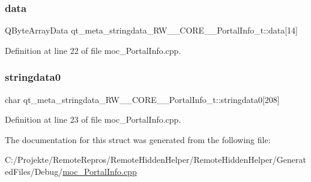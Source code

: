 \subsubsection{\texorpdfstring{data}{data}}
{\footnotesize\ttfamily Q\+Byte\+Array\+Data qt\+\_\+meta\+\_\+stringdata\+\_\+\+R\+W\+\_\+\+\_\+\+C\+O\+R\+E\+\_\+\+\_\+\+Portal\+Info\+\_\+t\+::data\mbox{[}14\mbox{]}}



Definition at line 22 of file moc\+\_\+\+Portal\+Info.\+cpp.

\hypertarget{structqt__meta__stringdata___r_w_____c_o_r_e_____portal_info__t_a1ad3d524b97d8b9d7602da3f49431797}{}\label{structqt__meta__stringdata___r_w_____c_o_r_e_____portal_info__t_a1ad3d524b97d8b9d7602da3f49431797} 
\subsubsection{\texorpdfstring{stringdata0}{stringdata0}}
{\footnotesize\ttfamily char qt\+\_\+meta\+\_\+stringdata\+\_\+\+R\+W\+\_\+\+\_\+\+C\+O\+R\+E\+\_\+\+\_\+\+Portal\+Info\+\_\+t\+::stringdata0\mbox{[}208\mbox{]}}



Definition at line 23 of file moc\+\_\+\+Portal\+Info.\+cpp.



The documentation for this struct was generated from the following file\+:\begin{DoxyCompactItemize}
\item 
C\+:/\+Projekte/\+Remote\+Repros/\+Remote\+Hidden\+Helper/\+Remote\+Hidden\+Helper/\+Generated\+Files/\+Debug/\hyperlink{moc___portal_info_8cpp}{moc\+\_\+\+Portal\+Info.\+cpp}\end{DoxyCompactItemize}
